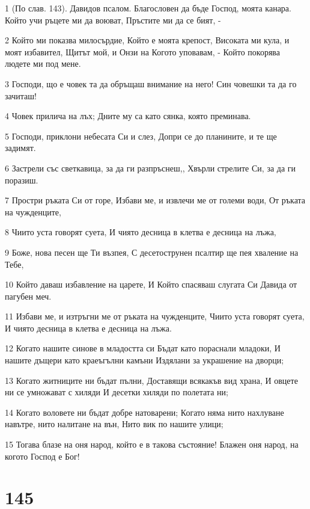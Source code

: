 \par 1 (По слав. 143). Давидов псалом. Благословен да бъде Господ, моята канара. Който учи ръцете ми да воюват, Пръстите ми да се бият, -
\par 2 Който ми показва милосърдие, Който е моята крепост, Високата ми кула, и моят избавител, Щитът мой, и Онзи на Когото уповавам, - Който покорява людете ми под мене.
\par 3 Господи, що е човек та да обръщаш внимание на него! Син човешки та да го зачиташ!
\par 4 Човек прилича на лъх; Дните му са като сянка, която преминава.
\par 5 Господи, приклони небесата Си и слез, Допри се до планините, и те ще задимят.
\par 6 Застрели със светкавица, за да ги разпръснеш,, Хвърли стрелите Си, за да ги поразиш.
\par 7 Простри ръката Си от горе, Избави ме, и извлечи ме от големи води, От ръката на чужденците,
\par 8 Чиито уста говорят суета, И чиято десница в клетва е десница на лъжа,
\par 9 Боже, нова песен ще Ти възпея, С десетострунен псалтир ще пея хваление на Тебе,
\par 10 Който даваш избавление на царете, И Който спасяваш слугата Си Давида от пагубен меч.
\par 11 Избави ме, и изтръгни ме от ръката на чужденците, Чиито уста говорят суета, И чиято десница в клетва е десница на лъжа.
\par 12 Когато нашите синове в младостта си Бъдат като пораснали младоки, И нашите дъщери като краеъгълни камъни Издялани за украшение на дворци;
\par 13 Когато житниците ни бъдат пълни, Доставящи всякакъв вид храна, И овцете ни се умножават с хиляди И десетки хиляди по полетата ни;
\par 14 Когато воловете ни бъдат добре натоварени; Когато няма нито нахлуване навътре, нито налитане на вън, Нито вик по нашите улици;
\par 15 Тогава блазе на оня народ, който е в такова състояние! Блажен оня народ, на когото Господ е Бог!

\chapter{145}

